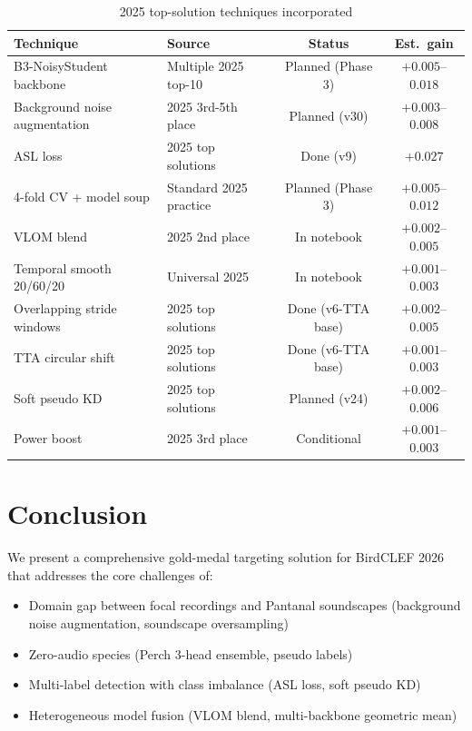 \documentclass[11pt,a4paper]{article}
\begin{document}
\begin{table}[H]
\centering
\caption{2025 top-solution techniques incorporated}
\begin{tabular}{llcc}
\toprule
\textbf{Technique} & \textbf{Source} & \textbf{Status} & \textbf{Est.\ gain} \\
\midrule
B3-NoisyStudent backbone & Multiple 2025 top-10 & Planned (Phase 3) & $+0.005$--$0.018$ \\
Background noise augmentation & 2025 3rd-5th place & Planned (v30) & $+0.003$--$0.008$ \\
ASL loss & 2025 top solutions & Done (v9) & $+0.027$ \\
4-fold CV + model soup & Standard 2025 practice & Planned (Phase 3) & $+0.005$--$0.012$ \\
VLOM blend & 2025 2nd place & In notebook & $+0.002$--$0.005$ \\
Temporal smooth 20/60/20 & Universal 2025 & In notebook & $+0.001$--$0.003$ \\
Overlapping stride windows & 2025 top solutions & Done (v6-TTA base) & $+0.002$--$0.005$ \\
TTA circular shift & 2025 top solutions & Done (v6-TTA base) & $+0.001$--$0.003$ \\
Soft pseudo KD & 2025 top solutions & Planned (v24) & $+0.002$--$0.006$ \\
Power boost & 2025 3rd place & Conditional & $+0.001$--$0.003$ \\
\bottomrule
\end{tabular}
\end{table}

\section{Conclusion}
\label{sec:conclusion}

We present a comprehensive gold-medal targeting solution for BirdCLEF 2026 that
addresses the core challenges of:
\begin{itemize}[leftmargin=1.5em]
\item Domain gap between focal recordings and Pantanal soundscapes (background noise augmentation, soundscape oversampling)
\item Zero-audio species (Perch 3-head ensemble, pseudo labels)
\item Multi-label detection with class imbalance (ASL loss, soft pseudo KD)
\item Heterogeneous model fusion (VLOM blend, multi-backbone geometric mean)
\end{itemize}
\end{document}
